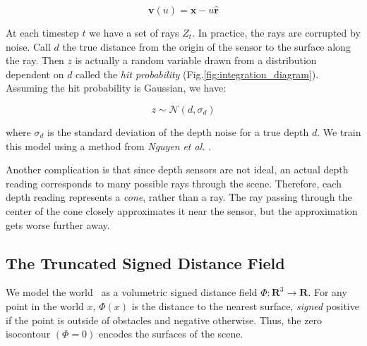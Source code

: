 \documentclass[conference]{IEEEtran}
\newcommand{\figref}[1]{Fig.\ref{#1}}
\newcommand{\etal}{\textit{et al.}\xspace}
\begin{document}
 \begin{equation}
 	\mathbf{v}(u) = \mathbf{x} - u\mathbf{\hat{r}}
 \end{equation}

At each timestep $t$ we have a set of rays $Z_t$. In practice, the rays are
corrupted by noise. Call $d$ the true distance from the origin of the sensor to
the surface along the ray. Then $z$ is actually a random variable drawn from a
distribution dependent  on $d$ called the \textit{hit probability}
(\figref{fig:integration_diagram}). Assuming the hit probability is Gaussian, we
have:

\begin{equation}
\label{eqn:hitprobability}
z \sim \mathcal{N}(d, \sigma_d)
\end{equation}

\noindent where $\sigma_d$ is the standard deviation of the depth noise for a
true depth $d$. We train this model using a method from \textit{Nguyen} \etal
\cite{Nguyen2012}.

Another complication is that since depth sensors are not ideal, an actual depth
reading corresponds to many possible rays through the scene. Therefore, each
depth reading represents a \textit{cone}, rather than a ray. The ray passing
through the center of the cone closely approximates it near the sensor, but the
approximation gets worse further away.


\subsection{The Truncated Signed Distance Field}
\label{section:TSDF}
We model the world~\cite{Curless1996} as a volumetric signed distance field $\Phi: \mathbf{R}^3
\to \mathbf{R}$. For any point in the world $x$, $\Phi(x)$
is the distance to the nearest surface, \emph{signed} positive if the point is
outside of obstacles and negative otherwise. Thus, the zero isocontour $(\Phi =
0)$ encodes the surfaces of the scene.
\end{document}
